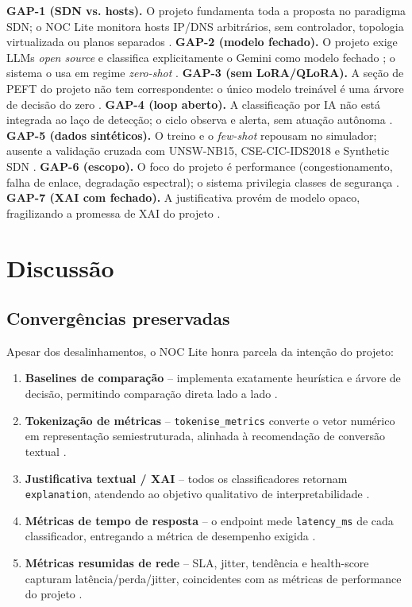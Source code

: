 \documentclass[12pt,a4paper]{article}
\begin{document}
\textbf{GAP-1 (SDN vs. hosts).} O projeto fundamenta toda a proposta no
paradigma SDN; o NOC Lite monitora hosts IP/DNS arbitrários, sem controlador,
topologia virtualizada ou planos separados \cite{rA19}. \textbf{GAP-2 (modelo
fechado).} O projeto exige LLMs \textit{open source} e classifica explicitamente
o Gemini como modelo fechado \cite{rRODRIGUES}; o sistema o usa em regime \textit{
zero-shot} \cite{rA317}. \textbf{GAP-3 (sem LoRA/QLoRA).} A seção de PEFT do projeto
não tem correspondente: o único modelo treinável é uma árvore de decisão do
zero \cite{rA41}\cite{rA42}. \textbf{GAP-4 (loop aberto).} A classificação por IA não está
integrada ao laço de detecção; o ciclo observa e alerta, sem atuação autônoma
\cite{rA133}. \textbf{GAP-5 (dados sintéticos).} O treino e o \textit{few-shot}
repousam no simulador; ausente a validação cruzada com UNSW-NB15,
CSE-CIC-IDS2018 e Synthetic SDN \cite{rA61}\cite{rA64}. \textbf{GAP-6 (escopo).} O foco do
projeto é performance (congestionamento, falha de enlace, degradação
espectral); o sistema privilegia classes de segurança \cite{rA512}. \textbf{GAP-7
(XAI com fechado).} A justificativa provém de modelo opaco, fragilizando a
promessa de XAI do projeto \cite{rA511}\cite{rA52}.

\section{Discussão}
\label{sec:discussao}

\subsection{Convergências preservadas}
\label{sec:convergencias}

Apesar dos desalinhamentos, o NOC Lite honra parcela da intenção do projeto:

\begin{enumerate}
  \item \textbf{Baselines de comparação} -- implementa exatamente heurística e
  árvore de decisão, permitindo comparação direta lado a lado \cite{rA210}\cite{rA217}.
  \item \textbf{Tokenização de métricas} -- \texttt{tokenise\_metrics} converte
  o vetor numérico em representação semiestruturada, alinhada à recomendação de
  conversão textual \cite{rA616}\cite{rA431}.
  \item \textbf{Justificativa textual / XAI} -- todos os classificadores retornam
  \texttt{explanation}, atendendo ao objetivo qualitativo de interpretabilidade
  \cite{rA511}\cite{rA537}.
  \item \textbf{Métricas de tempo de resposta} -- o endpoint mede
  \texttt{latency\_ms} de cada classificador, entregando a métrica de desempenho
  exigida \cite{rA31}.
  \item \textbf{Métricas resumidas de rede} -- SLA, jitter, tendência e
  health-score capturam latência/perda/jitter, coincidentes com as métricas de
  performance do projeto \cite{rA19}.
\end{enumerate}
\end{document}
